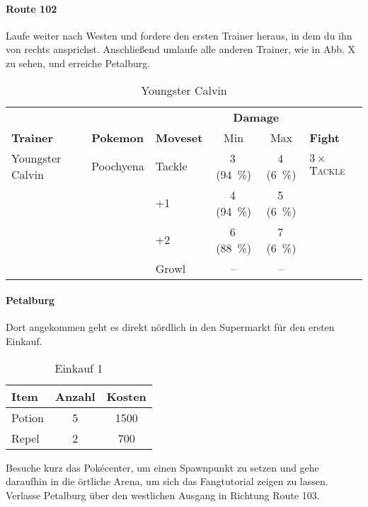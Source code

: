 \documentclass[11pt,a4paper,titlepage]{article}
\begin{document}
\paragraph{Route 102}
Laufe weiter nach Westen und fordere den ersten Trainer heraus, in dem du ihn von rechts ansprichst. Anschließend umlaufe alle anderen Trainer, wie in Abb. X zu sehen, und erreiche Petalburg. 
\begin{table}[htbp]
	\caption{Youngster Calvin}
	\centering
	\begin{tabular}{lllccl}
		\toprule 
		&&&\multicolumn{2}{c}{\textbf{Damage}}&\\
		\cmidrule(rl){4-5}
		\textbf{Trainer}&\textbf{Pokemon}&\textbf{Moveset}&Min&Max&\textbf{Fight}\\ 
		\midrule
		Youngster Calvin&Poochyena&Tackle&3\,(\SI{94}{\percent})&4\,(\SI{6}{\percent})&$3 \times$ \textsc{Tackle}\\
		&&+1&4\,(\SI{94}{\percent})&5\,(\SI{6}{\percent})&\\ 
		&&+2&6\,(\SI{88}{\percent})&7\,(\SI{6}{\percent})&\\
		&&Growl&--&--&\\
		\bottomrule
	\end{tabular}
\end{table}

\paragraph{Petalburg}
Dort angekommen geht es direkt nördlich in den Supermarkt für den ersten Einkauf.
\begin{table}[htbp]
	\caption{Einkauf 1}
	\centering
	\begin{tabular}{lcc}
		\toprule
		\textbf{Item} &\textbf{Anzahl}				&\textbf{Kosten}	\\
		\midrule
		Potion		&5 &1500				\\
		Repel		&2&700				\\
		\bottomrule
	\end{tabular}
	\label{tab:lookup}
\end{table}
Besuche kurz das Pokécenter, um einen Spawnpunkt zu setzen und gehe daraufhin in die örtliche Arena, um sich das Fangtutorial zeigen zu lassen. Verlasse Petalburg über den westlichen Ausgang in Richtung Route 103.\\
\end{document}
